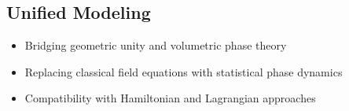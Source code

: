 \documentclass[12pt]{report} %
\begin{document}
\subsection{Unified Modeling}
\begin{itemize}
  \item Bridging geometric unity and volumetric phase theory  
  \item Replacing classical field equations with statistical phase dynamics  
  \item Compatibility with Hamiltonian and Lagrangian approaches  
\end{itemize}
\end{document}
